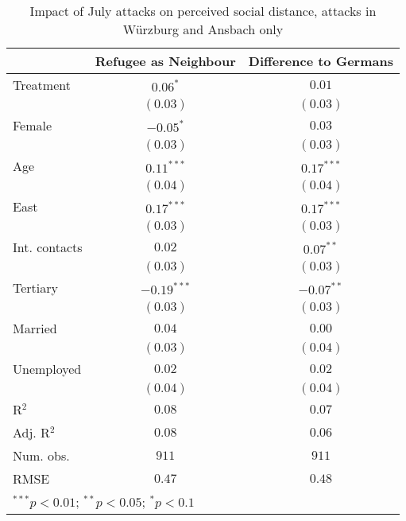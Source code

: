 
\begin{table}
\caption{Impact of July attacks on perceived social distance, attacks in Würzburg and Ansbach only}
\begin{center}
\begin{tabular}{l c c}
\toprule
 & Refugee as Neighbour & Difference to Germans \\
\midrule
Treatment     & $0.06^{*}$    & $0.01$       \\
              & $(0.03)$      & $(0.03)$     \\
Female        & $-0.05^{*}$   & $0.03$       \\
              & $(0.03)$      & $(0.03)$     \\
Age           & $0.11^{***}$  & $0.17^{***}$ \\
              & $(0.04)$      & $(0.04)$     \\
East          & $0.17^{***}$  & $0.17^{***}$ \\
              & $(0.03)$      & $(0.03)$     \\
Int. contacts & $0.02$        & $0.07^{**}$  \\
              & $(0.03)$      & $(0.03)$     \\
Tertiary      & $-0.19^{***}$ & $-0.07^{**}$ \\
              & $(0.03)$      & $(0.03)$     \\
Married       & $0.04$        & $0.00$       \\
              & $(0.03)$      & $(0.04)$     \\
Unemployed    & $0.02$        & $0.02$       \\
              & $(0.04)$      & $(0.04)$     \\
\midrule
R$^2$         & $0.08$        & $0.07$       \\
Adj. R$^2$    & $0.08$        & $0.06$       \\
Num. obs.     & $911$         & $911$        \\
RMSE          & $0.47$        & $0.48$       \\
\bottomrule
\multicolumn{3}{l}{\scriptsize{$^{***}p<0.01$; $^{**}p<0.05$; $^{*}p<0.1$}}
\end{tabular}
\label{tab_dist_no_nice}
\end{center}
\end{table}
